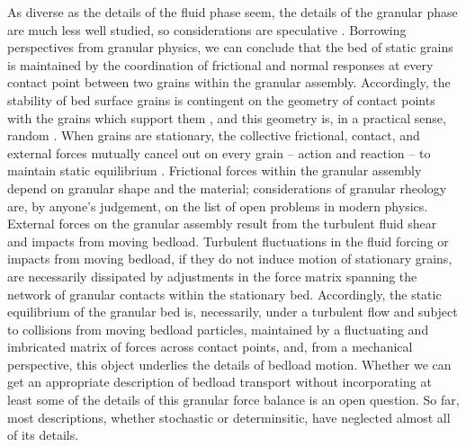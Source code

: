 \documentclass{article}
\begin{document}
As diverse as the details of the fluid phase seem, the details of the granular phase are much less well studied, so considerations are speculative \citep{Frey2011}. 
Borrowing perspectives from granular physics, we can conclude that the bed of static grains is maintained by the coordination of frictional and normal responses at every contact point between two grains within the granular assembly. 
Accordingly, the stability of bed surface grains is contingent on the geometry of contact points with the grains which support them \citep{Coleman1967, Paintal1971}, and this geometry is, in a practical sense, random \citep{Bennett1972}. 
When grains are stationary, the collective frictional, contact, and external forces mutually cancel out on every grain -- action and reaction -- to maintain static equilibrium  \citep{Cundall1979}. 
Frictional forces within the granular assembly depend on granular shape and the material; considerations of granular rheology are, by anyone's judgement, on the list of open problems in modern physics. 
External forces on the granular assembly result from the turbulent fluid shear and impacts from moving bedload. 
Turbulent fluctuations in the fluid forcing or impacts from moving bedload, if they do not induce motion of stationary grains, are necessarily dissipated by adjustments in the force matrix spanning the network of granular contacts within the stationary bed. 
Accordingly, the static equilibrium of the granular bed is, necessarily, under a turbulent flow and subject to collisions from moving bedload particles, maintained by a fluctuating and imbricated matrix of forces across contact points, and, from a mechanical perspective, this object underlies the details of bedload motion.
Whether we can get an appropriate description of bedload transport without incorporating at least some of the details of this granular force balance is an open question. 
So far, most descriptions, whether stochastic or determinsitic, have neglected almost all of its details. 
\end{document}
